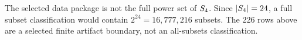 \begin{remark}
\label{rem:atlas-nonclassification}
The selected data package is not the full power set of \(S_4\). Since \(|S_4|=24\), a full subset classification would contain \(2^{24}=16{,}777{,}216\) subsets. The 226 rows above are a selected finite artifact boundary, not an all-subsets classification.
\end{remark}